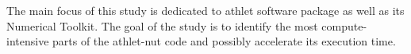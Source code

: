 The main focus of this study is dedicated to \gls{athlet} software package as well as its Numerical Toolkit. The goal of the study is to identify the most compute-intensive parts of the \gls{athlet}-\gls{nut} code and possibly accelerate its execution time.\\

